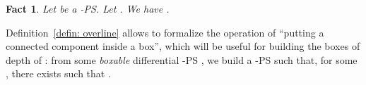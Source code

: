 \documentclass{article}
\theoremstyle{plain}
\newtheorem{definition}{Definition}
\newtheorem{example}{Example}
\newtheorem{fact}[theorem]{Fact}
\newcommand{\scalefactter}{0.33}
\newcommand{\pictter}[1]{\scalebox{\scalefactter}{}}
\begin{document}
\begin{fact}\label{fact: connected components}
Let  be a -PS. Let . We have .
\end{fact}

\begin{comment}
\begin{proof}
We prove, by induction on , that, for any , there exists  such that . If , then we set : since , we cannot have , hence .
\end{proof}
\end{comment}

\begin{comment}
\begin{definition}
Let  be a differential -PS. Let  and let . We set 

\end{definition}

\begin{example}
We have , where  is the PS of Figure~\ref{fig: taylor}.
\end{example}

\begin{fact}\label{fact: pouvoir definir G_{k, J}}
Let  be a differential -PS and let . We have
\begin{itemize}
\item 
\item and .
\end{itemize}
\end{fact}

So, by Fact~\ref{fact: sqsubseteq}, we can set .

\begin{example}
The differential ground-structure , where  is the PS of Figure~\ref{fig: taylor}, is represented in Figure~\ref{fig: G}.
\end{example}
\end{comment}


\begin{comment}
\begin{figure*}[!t]
\pictter{G}
\caption{, where  is the PS of Figure~\ref{fig: taylor}}
\label{fig: G}
\end{figure*}
\end{comment}



Definition~\ref{defin: overline} allows to formalize the operation of ``putting a connected component inside a box'', which will be useful for building the boxes of depth   of : from some \emph{boxable} differential -PS , we build a -PS  such that, for some , there exists  such that .
\end{document}

